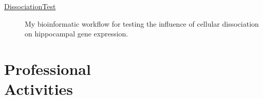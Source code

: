 \documentclass[margin,line]{CV}
\begin{document}
\begin{resume}
\begin{description}
\item [\href{https://github.com/raynamharris/DissociationTest}{DissociationTest}] My bioinformatic workflow for testing the influence of cellular dissociation on hippocampal gene expression.



\end{description}


    
\section{\mysidestyle Professional\\Activities}


\end{resume}
\end{document}

